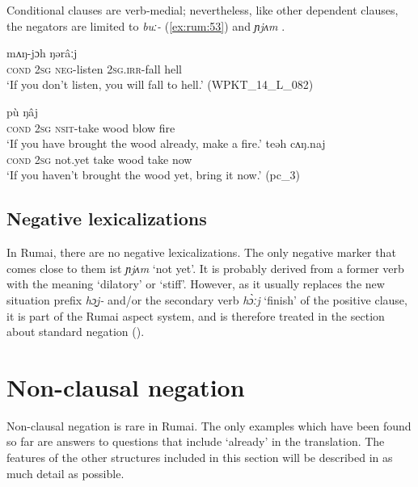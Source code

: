 \documentclass[output=paper,colorlinks,citecolor=brown]{langscibook}
\begin{document}
Conditional clauses are verb-medial; nevertheless, like other dependent clauses, the negators are limited to \textit{buː{}-} (\ref{ex:rum:53}) and \textit{ɲjʌm} .

\ea\label{ex:rum:53}
    	mʌŋ-jɔh	ŋərâːj \\
         {\db}\textsc{cond} 2\textsc{sg} \textsc{neg}{}-listen 2\textsc{sg.irr}{}-fall hell \\
    \glt ‘If you don’t listen, you will fall to hell.’ (WPKT\_14\_L\_082)
\z 

\ea\label{ex:rum:54}
    \ea\label{ex:rum:54a}
        	pù	ŋâj \\ 
             {\db}\textsc{cond} 2\textsc{sg} \textsc{nsit}{}-take wood blow fire \\
        \glt ‘If you have brought the wood already, make a fire.’
    \ex\label{ex:rum:54b}
        	teəh	cʌŋ.naj \\
             {\db}\textsc{cond} 2\textsc{sg} not.yet take wood take now \\
        \glt ‘If you haven’t brought the wood yet, bring it now.’ (pc\_3)
    \z
\z 

\subsection{Negative lexicalizations} \label{sec:rum:2.5}

In Rumai, there are no negative lexicalizations. The only negative marker that comes close to them ist \textit{ɲjʌm} ‘not yet’. It is probably derived from a former verb with the meaning ‘dilatory’ or ‘stiff’. However, as it usually replaces the new situation prefix \textit{hɔ̰j-} and/or the secondary verb \textit{hɔ̀ːj} ‘finish’ of the positive clause, it is part of the Rumai aspect system, and is therefore treated in the section about standard negation ().

\section{Non-clausal negation} \label{sec:rum:3}

Non-clausal negation is rare in Rumai. The only examples which have been found so far are answers to questions that include ‘already’ in the translation. The features of the other structures included in this section will be described in as much detail as possible.
\end{document}
